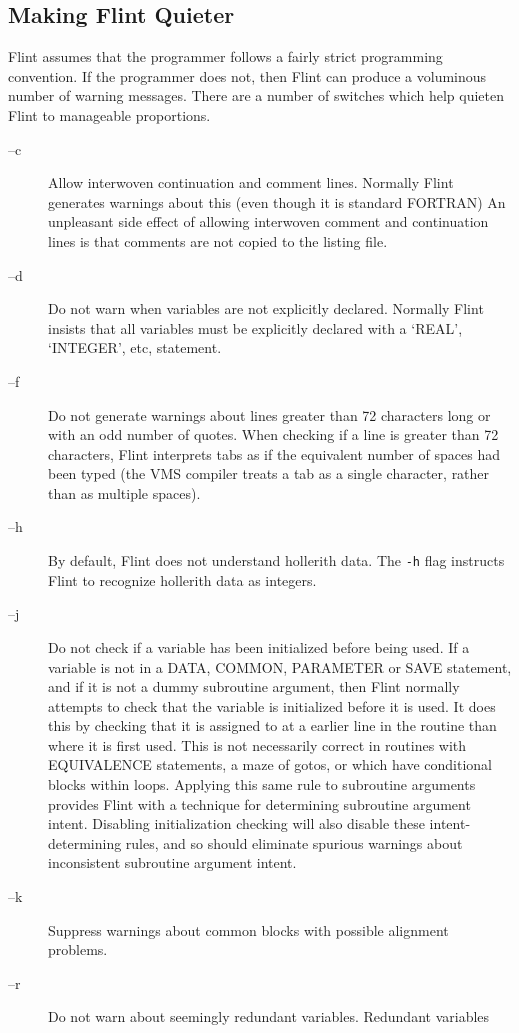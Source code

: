 \documentclass{report}
\begin{document}
\subsection{Making Flint Quieter}
Flint assumes that the programmer follows a fairly strict programming
convention. If the programmer does not, then Flint can produce a voluminous
number of warning messages. There are a number of switches which help
quieten Flint to manageable proportions.
\begin{description}
\item[--c] Allow interwoven continuation and comment lines. Normally Flint
generates warnings about this (even though it is standard FORTRAN)
An unpleasant side effect of allowing interwoven
comment and continuation lines is that comments are not copied to the
listing file.
\item[--d] Do not warn when variables are not explicitly declared. Normally
Flint insists that all variables must be explicitly declared with a `REAL',
`INTEGER', etc, statement.
\item[--f] Do not generate warnings about lines greater than 72 characters long
or with an odd number of quotes. When checking if a line is
greater than 72 characters, Flint interprets tabs as if the equivalent
number of spaces had been typed (the VMS compiler treats a tab as a single
character, rather than as multiple spaces).
\item[--h] By default, Flint does not understand hollerith data. The {\tt -h}
flag instructs Flint to recognize hollerith data as integers.
\item[--j] Do not check if a variable has been initialized before being used.
If a variable is not in a DATA, COMMON, PARAMETER or SAVE statement,
and if it is not a dummy subroutine argument, then Flint normally
attempts to check that the variable is initialized before it is used. It does
this by checking that it is assigned to at a earlier line in the routine than
where it is first used. This is not necessarily correct in routines with
EQUIVALENCE statements, a maze of gotos, or which
have conditional blocks within loops. Applying this same rule to subroutine
arguments provides Flint with a technique for determining subroutine argument
intent. Disabling initialization checking will also disable these
intent-determining rules, and so should eliminate
spurious warnings about inconsistent subroutine argument intent.
\item[--k] Suppress warnings about common blocks with possible alignment
problems.
\item[--r] Do not warn about seemingly redundant variables. Redundant variables

\end{description}
\end{document}
